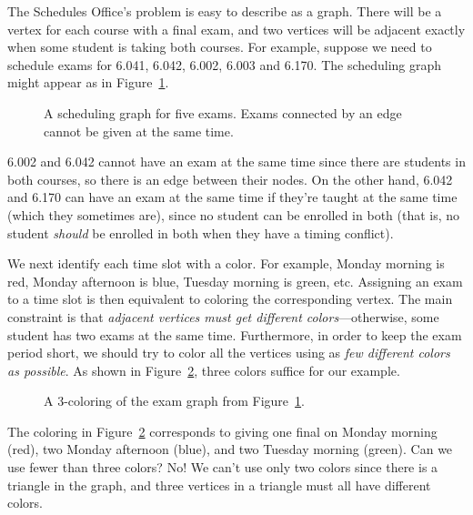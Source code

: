 The Schedules Office's problem is easy to describe as a graph.  There
will be a vertex for each course with a final exam, and two vertices
will be adjacent exactly when some student is taking both courses.
For example, suppose we need to schedule exams for 6.041, 6.042,
6.002, 6.003 and 6.170.  The scheduling graph might appear as in
Figure~\ref{fig:5R}.

\begin{figure}


\caption{A scheduling graph for five exams.  Exams connected by an
  edge cannot be given at the same time.}

\label{fig:5R}

\end{figure}

6.002 and 6.042 cannot have an exam at the same time since there are
students in both courses, so there is an edge between their nodes.  On the
other hand, 6.042 and 6.170 can have an exam at the same time if they're
taught at the same time (which they sometimes are), since no student can
be enrolled in both (that is, no student \emph{should} be enrolled in both
when they have a timing conflict).

We next identify each time slot with a color.  For example, Monday
morning is red, Monday afternoon is blue, Tuesday morning is green,
etc.  Assigning an exam to a time slot is then equivalent to coloring
the corresponding vertex.  The main constraint is that \emph{adjacent
  vertices must get different colors}---otherwise, some student has
two exams at the same time.  Furthermore, in order to keep the exam
period short, we should try to color all the vertices using as
\emph{few different colors as possible}.  As shown in Figure~\ref{fig:5S},
three colors suffice for our example.

\begin{figure}


\caption{A 3-coloring of the exam graph from Figure~\ref{fig:5R}.}

\label{fig:5S}

\end{figure}

The coloring in Figure~\ref{fig:5S} corresponds to giving one final on
Monday morning (red), two Monday afternoon (blue), and two Tuesday
morning (green).  Can we use fewer than three colors?  No! We can't
use only two colors since there is a triangle in the graph, and three
vertices in a triangle must all have different colors.

